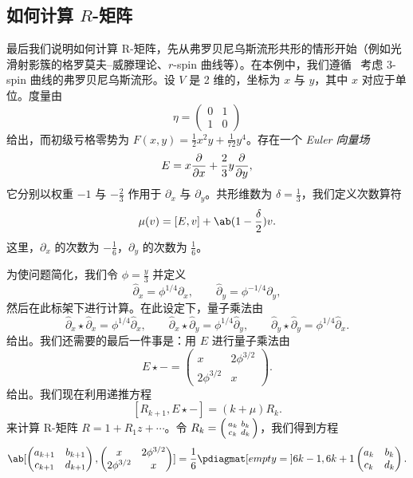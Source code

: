 \documentclass{amsart}
\theoremstyle{definition}
\theoremstyle{remark}
\theoremstyle{plain}
\theoremstyle{definition}
\theoremstyle{remark}
\newcommand{\1}{\mathbf{1}}
\newcommand{\2}{\mathbf{2}}
\newcommand{\3}{\mathbf{3}}
\begin{document}
\subsection{如何计算 \(R\)-矩阵}%
\label{sub:How to compute the R-matrix}

最后我们说明如何计算 R-矩阵，先从弗罗贝尼乌斯流形共形的情形开始（例如光滑射影簇的格罗莫夫–威滕理论、\(r\)-spin 曲线等）。在本例中，我们遵循~\cite{PPZ2015} 考虑 3-spin 曲线的弗罗贝尼乌斯流形。设 \(V\) 是 2 维的，坐标为 \(x\) 与 \(y\)，其中 \(x\) 对应于单位。度量由
\[ \eta = \begin{pmatrix}
    0 & 1 \\
    1 & 0
\end{pmatrix} \]
给出，而初级亏格零势为 \(F(x,y) = \frac{1}{2} x^2 y + \frac{1}{72} y^4\)。存在一个 \textit{Euler 向量场}
\[ E = x \pdv{}{x} + \frac{2}{3} y \pdv{}{y}, \]
它分别以权重 \(-1\) 与 \(-\frac{2}{3}\) 作用于 \(\partial_x\) 与 \(\partial_y\)。共形维数为 \(\delta = \frac{1}{3}\)，我们定义次数算符
\[ \mu(v) = [E,v] + \ab(1 - \frac{\delta}{2})v. \]
这里，\(\partial_x\) 的次数为 \(-\frac{1}{6}\)，\(\partial_y\) 的次数为 \(\frac{1}{6}\)。

为使问题简化，我们令 \(\phi = \frac{y}{3}\) 并定义
\[ \hat{\partial}_x = \phi^{1/4} \partial_x, \qquad \hat{\partial}_y = \phi^{-1/4} \partial_y, \]
然后在此标架下进行计算。在此设定下，量子乘法由
\[ \hat{\partial}_x \star \hat{\partial}_x = \phi^{1/4} \hat{\partial}_x, \qquad \hat{\partial}_x \star \hat{\partial}_y = \phi^{1/4} \hat{\partial}_y, \qquad \hat{\partial}_y \star \hat{\partial}_y = \phi^{1/4} \hat{\partial}_x. \]
给出。我们还需要的最后一件事是：用 \(E\) 进行量子乘法由
\[ E \star - = \begin{pmatrix}
    x & 2 \phi^{3/2} \\
    2 \phi^{3/2} & x 
\end{pmatrix}. \]
给出。我们现在利用递推方程
\[ [R_{k+1}, E \star -] = (k + \mu) R_k. \]
来计算 R-矩阵 \(R = 1 + R_1 z + \cdots\)。令 \(R_k = \begin{psmallmatrix}
    a_k & b_k \\
    c_k & d_k
\end{psmallmatrix}\)，我们得到方程
\[ \ab[
    \begin{pmatrix}
        a_{k+1} & b_{k+1} \\
        c_{k+1} & d_{k+1}
    \end{pmatrix}, \begin{pmatrix}
        x & 2 \phi^{3/2} \\
        2 \phi^{3/2} & x 
    \end{pmatrix}
] = \frac{1}{6} \pdiagmat[empty={}]{6k-1, 6k+1} \begin{pmatrix}
    a_k & b_k \\
    c_k & d_k 
\end{pmatrix}. \]
\end{document}
